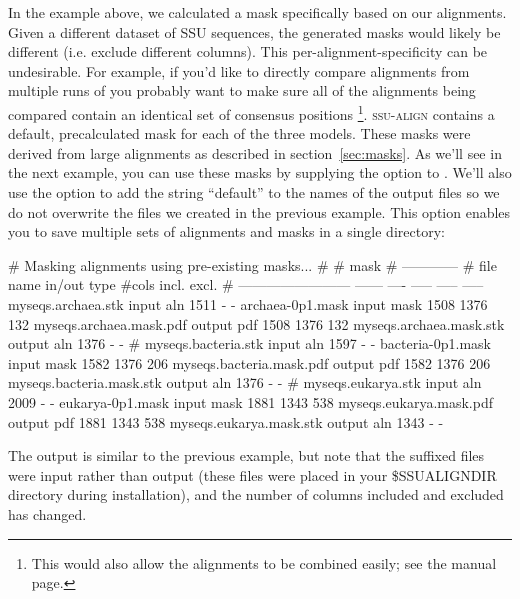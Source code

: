 In the  example above, we calculated a mask
specifically based on our  alignments. Given a different
dataset of SSU sequences, the generated masks would likely be
different (i.e. exclude different columns). This
per-alignment-specificity can be undesirable. For example, if you'd
like to directly compare alignments from multiple runs of
 you probably want to make sure all of the
alignments being compared contain an identical set of consensus
positions \footnote{This would also allow the alignments to be combined
easily; see the  manual page.}. \textsc{ssu-align}
contains a default, precalculated mask for each of the three
models. These masks were derived from large alignments as
described in section~\ref{sec:masks}. As we'll see in the next example, you
can use these masks by supplying the  option to
. We'll also use the  option to add the
string ``default'' to the names of the output files so we do not
overwrite the files we created in the previous example. This option
enables you to save multiple sets of alignments and masks in a single
directory:


\begin{sreoutput}
# Masking alignments using pre-existing masks...
#
#                                                    mask    
#                                                ------------
# file name                 in/out  type  #cols  incl.  excl.
# ------------------------  ------  ----  -----  -----  -----
  myseqs.archaea.stk         input   aln   1511      -      -
  archaea-0p1.mask           input  mask   1508   1376    132
  myseqs.archaea.mask.pdf   output   pdf   1508   1376    132
  myseqs.archaea.mask.stk   output   aln   1376      -      -
#
  myseqs.bacteria.stk        input   aln   1597      -      -
  bacteria-0p1.mask          input  mask   1582   1376    206
  myseqs.bacteria.mask.pdf  output   pdf   1582   1376    206
  myseqs.bacteria.mask.stk  output   aln   1376      -      -
#
  myseqs.eukarya.stk         input   aln   2009      -      -
  eukarya-0p1.mask           input  mask   1881   1343    538
  myseqs.eukarya.mask.pdf   output   pdf   1881   1343    538
  myseqs.eukarya.mask.stk   output   aln   1343      -      -
\end{sreoutput}

The output is similar to the previous example, but note that the
 suffixed files were input rather than output (these files
were placed in your \$SSUALIGNDIR directory during installation), and the number
of columns included and excluded has changed.

